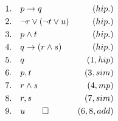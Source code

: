 \begin{align*}
    1. \hspace{10pt} & p \rightarrow q & (hip.) \\
    2. \hspace{10pt} & \neg r \vee (\neg t \vee u) & (hip.) \\
    3. \hspace{10pt} & p \wedge t & (hip.) \\
    4. \hspace{10pt} & q \rightarrow (r \wedge s) & (hip.) \\
    5. \hspace{10pt} & q & (1, hip) \\
    6. \hspace{10pt} & p, t & (3, sim) \\
    7. \hspace{10pt} & r \wedge s & (4, mp) \\
    8. \hspace{10pt} & r, s & (7, sim) \\
    9. \hspace{10pt} & u \qed & (6, 8, add)
\end{align*}















